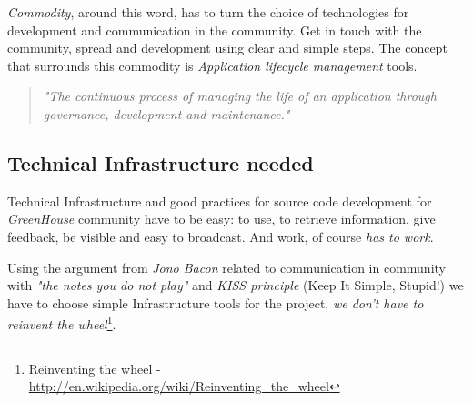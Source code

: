 \documentclass[11pt]{scrartcl}
\begin{document}
\par \emph{Commodity}, around this word, has to turn the choice of technologies for development and communication in the community. Get in touch with the community, spread and development using clear and simple steps. The concept that surrounds this commodity is \emph{Application lifecycle management} tools.

\begin{quotation}
    \emph{"The continuous process of managing the life of an application through governance, development and maintenance."}
\end{quotation}

\subsection{Technical Infrastructure needed}
\label{sub:infrastructure}

\par Technical Infrastructure and good practices for source code development for \emph{GreenHouse} community have to be easy: to use, to retrieve information, give feedback, be visible and easy to broadcast. And work, of course \emph{has to work}.

\par Using the argument from \emph{Jono Bacon} related to communication in community with \emph{"the notes you do not play"} and \emph{KISS principle} (Keep It Simple, Stupid!\cite{kiss}) we have to choose simple Infrastructure tools for the project, \emph{we don't have to reinvent the wheel}\footnote{Reinventing the wheel - \url{http://en.wikipedia.org/wiki/Reinventing_the_wheel}}.
\end{document}
